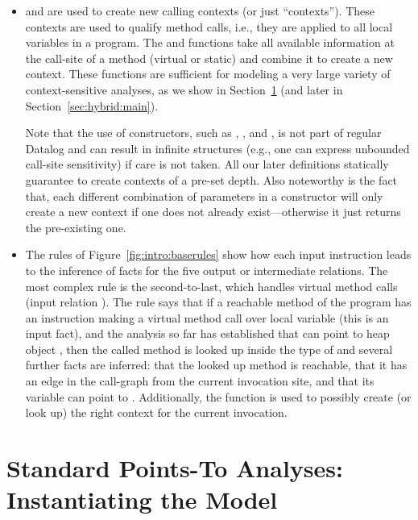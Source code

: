 \begin{itemize}
\item {} and  are used to create new calling contexts (or just ``contexts''). These contexts are used to qualify method calls, i.e., they are applied to all local variables in a program. The  and  functions take all available information at the call-site of a method (virtual or static) and combine it to create a new context. These functions are sufficient for modeling a very large variety of context-sensitive analyses, as we show in Section~\ref{sec:intro:model-instances} (and later in Section~\ref{sec:hybrid:main}).

Note that the use of constructors, such as , , and , is not part of regular Datalog and can result in infinite structures (e.g., one can express unbounded call-site sensitivity) if care is not taken. All our later definitions statically guarantee to create contexts of a pre-set depth. Also noteworthy is the fact that, each different combination of parameters in a constructor will only create a new context if one does not already exist---otherwise it just returns the pre-existing one.

\item The rules of Figure~\ref{fig:intro:baserules} show how each input instruction leads to the inference of facts for the five output or intermediate relations. The most complex rule is the second-to-last, which handles virtual method calls (input relation ). The rule says that if a reachable method of the program has an instruction making a virtual method call over local variable  (this is an input fact), and the analysis so far has established that  can point to heap object , then the called method is looked up inside the type of  and several further facts are inferred: that the looked up method is reachable, that it has an edge in the call-graph from the current invocation site, and that its  variable can point to . Additionally, the  function is used to possibly create (or look up) the right context for the current invocation.
\end{itemize}


\section{Standard Points-To Analyses: Instantiating the Model} 
\label{sec:intro:model-instances}

